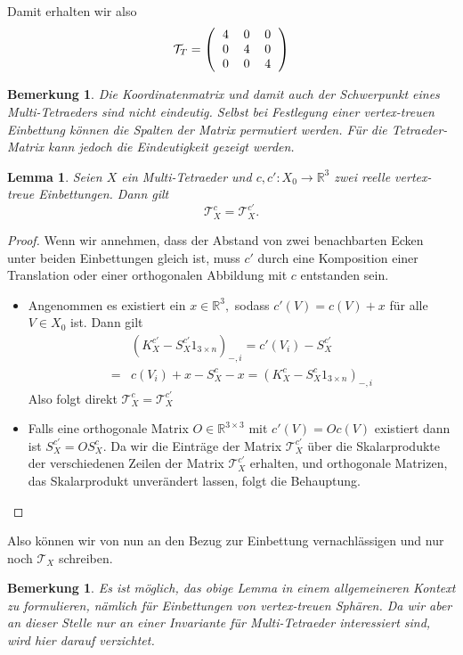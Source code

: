 \documentclass[12pt,titlepage,twoside,cleardoublepage]{article}
\theoremstyle{nummermitklammern}
\newtheorem{lemma}[temp]{Lemma}
\newtheorem{bemerkung}[temp]{Bemerkung}
\newtheorem{lemma}[zahl]{Lemma}
\newtheorem{bemerkung}[zahl]{Bemerkung}
\numberwithin{equation}{section}
\begin{document}
Damit erhalten wir also 
\[
\mathcal{T}_T=\left(\begin{tabular}{ccc}
4&0&0\\
0&4&0\\
0&0&4\\
\end{tabular}\right)
\]
\begin{bemerkung}
Die Koordinatenmatrix und damit auch der Schwerpunkt  eines Multi-Tetraeders sind nicht eindeutig. Selbst bei Festlegung einer vertex-treuen Einbettung können die Spalten der Matrix permutiert werden. Für die Tetraeder-Matrix kann jedoch die Eindeutigkeit gezeigt werden.
\end{bemerkung}
\begin{lemma}
Seien $X$ ein Multi-Tetraeder und $c,c':X_0\to \mathbb{R}^3$ zwei reelle vertex-treue Einbettungen. Dann gilt 
\[
\mathcal{T}^c_X=\mathcal{T}_X^{c'}.
\]
\end{lemma}
\begin{proof}
Wenn wir annehmen, dass der Abstand von zwei benachbarten Ecken unter beiden Einbettungen gleich ist, muss $c'$ durch eine Komposition einer Translation oder einer orthogonalen Abbildung mit $c$ entstanden sein. 
\begin{itemize}
\item Angenommen es existiert ein $x\in \mathbb{R}^3,$ sodass $c'(V)=c(V)+x$ für alle $V\in X_0$ ist. Dann gilt 
\begin{align*}
&(K_X^{c'}-S_X^{c'}1_{3\times n})_{-,i}=c'(V_i)-S_X^{c'}\\
=&c(V_i)+x-S_X^c-x=(K_X^{c}-S_X^{c}1_{3\times n})_{-,i}
\end{align*}
Also folgt direkt $\mathcal{T}_X^c=\mathcal{T}_X^{c'}$
\item Falls eine orthogonale Matrix $O\in \mathbb{R}^{3\times 3}$ mit $c'(V)=Oc(V)$ existiert dann ist $S_X^{c'}=OS_X^c.$ Da wir die Einträge der Matrix $\mathcal{T}_X^{c'}$ über die Skalarprodukte der verschiedenen Zeilen der Matrix $\mathcal{T}_X^{c'}$ erhalten, und orthogonale Matrizen, das Skalarprodukt unverändert lassen, folgt die Behauptung.
\end{itemize} 
\end{proof}
Also können wir von nun an den Bezug zur Einbettung vernachlässigen und nur noch $\mathcal{T}_X$ schreiben. 
\begin{bemerkung}
Es ist möglich, das obige Lemma in einem allgemeineren Kontext zu formulieren, nämlich für Einbettungen von vertex-treuen Sphären. Da wir aber an dieser Stelle nur an einer Invariante für Multi-Tetraeder interessiert sind, wird hier darauf verzichtet. 
\end{bemerkung}
\end{document}
